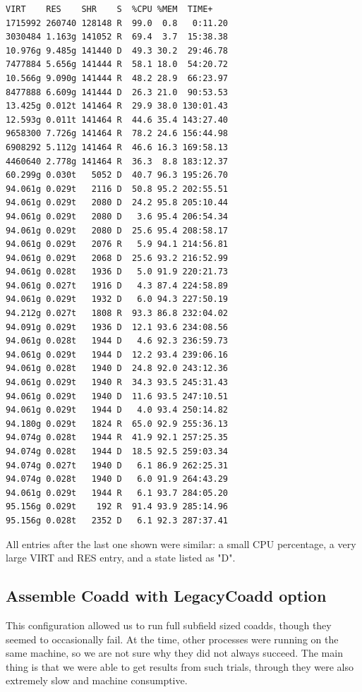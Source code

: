 \documentclass[modern]{aastex61}
\begin{document}
\begin{small}
\begin{verbatim}
VIRT    RES    SHR    S  %CPU %MEM  TIME+      
1715992 260740 128148 R  99.0  0.8   0:11.20
3030484 1.163g 141052 R  69.4  3.7  15:38.38
10.976g 9.485g 141440 D  49.3 30.2  29:46.78
7477884 5.656g 141444 R  58.1 18.0  54:20.72
10.566g 9.090g 141444 R  48.2 28.9  66:23.97
8477888 6.609g 141444 D  26.3 21.0  90:53.53
13.425g 0.012t 141464 R  29.9 38.0 130:01.43
12.593g 0.011t 141464 R  44.6 35.4 143:27.40
9658300 7.726g 141464 R  78.2 24.6 156:44.98
6908292 5.112g 141464 R  46.6 16.3 169:58.13
4460640 2.778g 141464 R  36.3  8.8 183:12.37
60.299g 0.030t   5052 D  40.7 96.3 195:26.70
94.061g 0.029t   2116 D  50.8 95.2 202:55.51
94.061g 0.029t   2080 D  24.2 95.8 205:10.44
94.061g 0.029t   2080 D   3.6 95.4 206:54.34
94.061g 0.029t   2080 D  25.6 95.4 208:58.17
94.061g 0.029t   2076 R   5.9 94.1 214:56.81
94.061g 0.029t   2068 D  25.6 93.2 216:52.99
94.061g 0.028t   1936 D   5.0 91.9 220:21.73 
94.061g 0.027t   1916 D   4.3 87.4 224:58.89 
94.061g 0.029t   1932 D   6.0 94.3 227:50.19 
94.212g 0.027t   1808 R  93.3 86.8 232:04.02 
94.091g 0.029t   1936 D  12.1 93.6 234:08.56 
94.061g 0.028t   1944 D   4.6 92.3 236:59.73 
94.061g 0.029t   1944 D  12.2 93.4 239:06.16 
94.061g 0.028t   1940 D  24.8 92.0 243:12.36 
94.061g 0.029t   1940 R  34.3 93.5 245:31.43 
94.061g 0.029t   1940 D  11.6 93.5 247:10.51 
94.061g 0.029t   1944 D   4.0 93.4 250:14.82 
94.180g 0.029t   1824 R  65.0 92.9 255:36.13 
94.074g 0.028t   1944 R  41.9 92.1 257:25.35 
94.074g 0.028t   1944 D  18.5 92.5 259:03.34 
94.074g 0.027t   1940 D   6.1 86.9 262:25.31 
94.074g 0.028t   1940 D   6.0 91.9 264:43.29 
94.061g 0.029t   1944 R   6.1 93.7 284:05.20 
95.156g 0.029t    192 R  91.4 93.9 285:14.96 
95.156g 0.028t   2352 D   6.1 92.3 287:37.41 
\end{verbatim}
\end{small}

All entries after the last one shown were similar: a small CPU percentage, a very large VIRT and RES entry, and a state listed as "D".

\subsection{Assemble Coadd with LegacyCoadd option}
This configuration allowed us to run full subfield sized coadds, though they seemed to occasionally fail. At the time, other processes were running on the same machine, so we are not sure why they did not always succeed. The main thing is that we were able to get results from such trials, through they were also extremely slow and machine consumptive.
\end{document}
